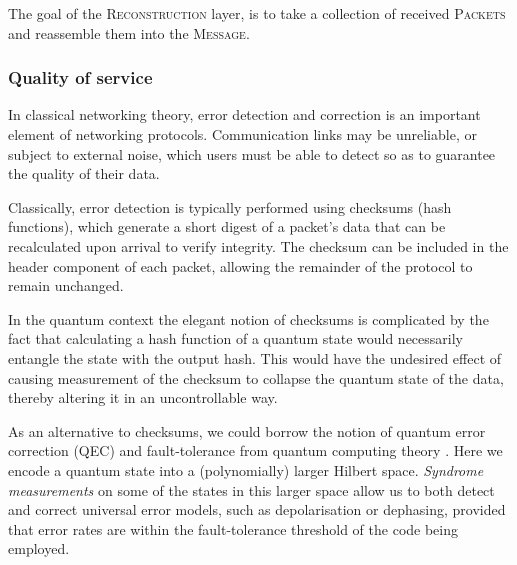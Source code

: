 \begin{table}[htpb]
\caption{The goal of the \textsc{Reconstruction} layer, is to take a collection of received \textsc{Packets} and reassemble them into the \textsc{Message}.} \label{alg:reconstruction}
\end{table}

%
%

\subsubsection{Quality of service} \label{sec:QOS} 

In classical networking theory, error detection and correction is an important element of networking protocols. Communication links may be unreliable, or subject to external noise, which users must be able to detect so as to guarantee the quality of their data.

Classically, error detection is typically performed using checksums (hash functions), which generate a short digest of a packet's data that can be recalculated upon arrival to verify integrity. The checksum can be included in the header component of each packet, allowing the remainder of the protocol to remain unchanged.

In the quantum context the elegant notion of checksums is complicated by the fact that calculating a hash function of a quantum state would necessarily entangle the state with the output hash. This would have the undesired effect of causing measurement of the checksum to collapse the quantum state of the data, thereby altering it in an uncontrollable way.

As an alternative to checksums, we could borrow the notion of quantum error correction (QEC) and fault-tolerance from quantum computing theory \cite{???}. Here we encode a quantum state into a (polynomially) larger Hilbert space. \textit{Syndrome measurements} on some of the states in this larger space allow us to both detect and correct universal error models, such as depolarisation or dephasing, provided that error rates are within the fault-tolerance threshold of the code being employed.


